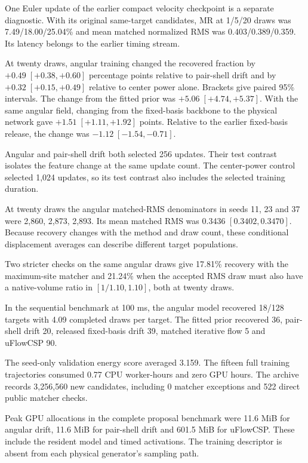 One Euler update of the earlier compact velocity checkpoint is a separate diagnostic. With its original same-target candidates, MR at 1/5/20 draws was 7.49/18.00/25.04\% and mean matched normalized RMS was 0.403/0.389/0.359. Its latency belongs to the earlier timing stream.

At twenty draws, angular training changed the recovered fraction by \(+0.49\;[+0.38,+0.60]\) percentage points relative to pair-shell drift and by \(+0.32\;[+0.15,+0.49]\) relative to center power alone. Brackets give paired 95\% intervals. The change from the fitted prior was \(+5.06\;[+4.74,+5.37]\). With the same angular field, changing from the fixed-basis backbone to the physical network gave \(+1.51\;[+1.11,+1.92]\) points. Relative to the earlier fixed-basis release, the change was \(-1.12\;[-1.54,-0.71]\).

Angular and pair-shell drift both selected 256 updates. Their test contrast isolates the feature change at the same update count. The center-power control selected 1,024 updates, so its test contrast also includes the selected training duration.

At twenty draws the angular matched-RMS denominators in seeds 11, 23 and 37 were 2,860, 2,873, 2,893. Its mean matched RMS was 0.3436 \([0.3402,0.3470]\). Because recovery changes with the method and draw count, these conditional displacement averages can describe different target populations.

Two stricter checks on the same angular draws give 17.81\% recovery with the maximum-site matcher and 21.24\% when the accepted RMS draw must also have a native-volume ratio in $[1/1.10,1.10]$, both at twenty draws.

In the sequential benchmark at 100 ms, the angular model recovered 18/128 targets with 4.09 completed draws per target. The fitted prior recovered 36, pair-shell drift 20, released fixed-basis drift 39, matched iterative flow 5 and uFlowCSP 90.

The seed-only validation energy score averaged 3.159. The fifteen full training trajectories consumed 0.77 CPU worker-hours and zero GPU hours. The archive records 3,256,560 new candidates, including 0 matcher exceptions and 522 direct public matcher checks.

Peak GPU allocations in the complete proposal benchmark were 11.6 MiB for angular drift, 11.6 MiB for pair-shell drift and 601.5 MiB for uFlowCSP. These include the resident model and timed activations. The training descriptor is absent from each physical generator's sampling path.

